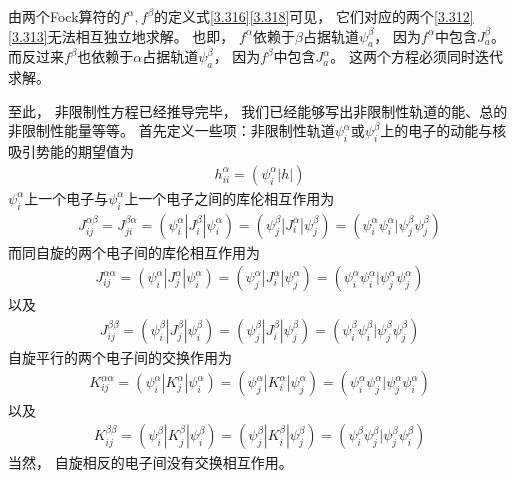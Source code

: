 由两个Fock算符的$f^\alpha,f^\beta$的定义式\eqref{3.316}\eqref{3.318}可见，
它们对应的两个\eqref{3.312}\eqref{3.313}无法相互独立地求解。
也即，
$f^\alpha$依赖于$\beta$占据轨道$\psi_a^\beta$，
因为$f^\alpha$中包含$J_a^\beta$。
而反过来$f^\beta$也依赖于$\alpha$占据轨道$\psi_a^\beta$，
因为$f^\beta$中包含$J_a^\alpha$。
这两个方程必须同时迭代求解。


至此，
非限制性\hft 方程已经推导完毕，
我们已经能够写出非限制性轨道的能、总的非限制性能量等等。
首先定义一些项：非限制性轨道$\psi_i^\alpha$或$\psi_i^\beta$上的电子的动能与核吸引势能的期望值为
\begin{align}\label{3.321}
	h_{ii}^\alpha = (\psi_i^\alpha|h|)
\end{align}
$\psi_i^\alpha$上一个电子与$\psi_i^\alpha$上一个电子之间的库伦相互作用为
\begin{align}\label{3.322}
	J_{ij}^{\alpha\beta} = J_{ji}^{\beta\alpha} = (\psi_i^\alpha|J_{i}^\beta|\psi_i^\alpha) = (\psi_j^\beta|J_{i}^\alpha|\psi_j^\beta) = (\psi_i^\alpha\psi_i^\alpha|\psi_j^\beta\psi_j^\beta)
\end{align}
而同自旋的两个电子间的库伦相互作用为
\begin{align}\label{3.323}
	J_{i j}^{\alpha \alpha}=(\psi_{i}^{\alpha}|J_{j}^{\alpha}| \psi_{i}^{\alpha})=(\psi_{j}^{\alpha}|J_{i}^{\alpha}| \psi_{j}^{\alpha})=(\psi_{i}^{\alpha} \psi_{i}^{\alpha} | \psi_{j}^{\alpha} \psi_{j}^{\alpha})
\end{align}
以及
\begin{align}\label{3.324}
	J_{i j}^{\beta \beta}=(\psi_{i}^{\beta}|J_{j}^{\beta}| \psi_{i}^{\beta})=(\psi_{j}^{\beta}|J_{i}^{\beta}| \psi_{j}^{\beta})=(\psi_{i}^{\beta} \psi_{i}^{\beta} | \psi_{j}^{\beta} \psi_{j}^{\beta})
\end{align}
自旋平行的两个电子间的交换作用为
\begin{align}\label{3.325}
	K_{i j}^{\alpha\alpha}=(\psi_{i}^{\alpha}|K_{j}^{\alpha}| \psi_{i}^{\alpha})=(\psi_{j}^{\alpha}|K_{i}^{\alpha}| \psi_{j}^{\alpha})=(\psi_{i}^{\alpha} \psi_{j}^{\alpha} | \psi_{j}^{\alpha} \psi_{i}^{\alpha})
\end{align}
以及
\begin{align}\label{3.326}
	K_{i j}^{\beta\beta}=(\psi_{i}^{\beta}|K_{j}^{\beta}| \psi_{i}^{\beta})=(\psi_{j}^{\beta}|K_{i}^{\beta}| \psi_{j}^{\beta})=(\psi_{i}^{\beta} \psi_{j}^{\beta} | \psi_{j}^{\beta} \psi_{i}^{\beta})
\end{align}
当然，
自旋相反的电子间没有交换相互作用。


